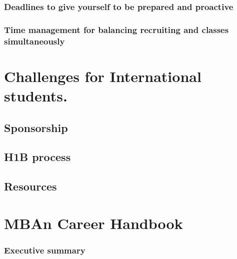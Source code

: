 \documentclass[
]{book}
\begin{document}
\hypertarget{deadlines-to-give-yourself-to-be-prepared-and-proactive}{%
\subsection{Deadlines to give yourself to be prepared and proactive}\label{deadlines-to-give-yourself-to-be-prepared-and-proactive}}

\hypertarget{time-management-for-balancing-recruiting-and-classes-simultaneously}{%
\subsection{Time management for balancing recruiting and classes simultaneously}\label{time-management-for-balancing-recruiting-and-classes-simultaneously}}

\hypertarget{challenges-for-international-students.}{%
\chapter{Challenges for International students.}\label{challenges-for-international-students.}}

\hypertarget{sponsorship}{%
\section{Sponsorship}\label{sponsorship}}

\hypertarget{h1b-process}{%
\section{H1B process}\label{h1b-process}}

\hypertarget{resources}{%
\section{Resources}\label{resources}}

\hypertarget{mban-career-handbook}{%
\chapter{MBAn Career Handbook}\label{mban-career-handbook}}

\hypertarget{executive-summary}{%
\subsection{Executive summary}\label{executive-summary}}
\end{document}
